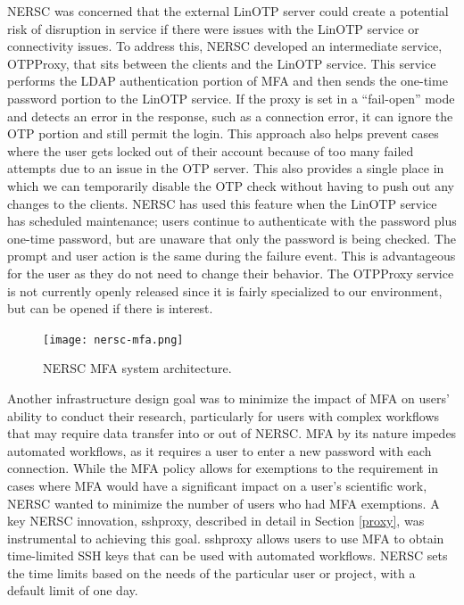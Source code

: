 \documentclass[sigconf,review]{acmart}
\begin{document}
NERSC was concerned that the external LinOTP server could create a potential
risk of disruption in service if there were issues with the LinOTP service or
connectivity issues.  To address this, NERSC developed an intermediate service,
OTPProxy, that sits between the clients and the LinOTP service.  This service
performs the LDAP authentication portion of MFA and then sends the one-time
password portion to the LinOTP service.  If the proxy is set in a ``fail-open''
mode and detects an error in the response, such as a connection error, it can
ignore the OTP portion and still permit the login.  This approach also helps
prevent cases where the user gets locked out of their account because of too
many failed attempts due to an issue in the OTP server.  This also provides a
single place in which we can temporarily disable the OTP check without having to
push out any changes to the clients.  NERSC has used this feature when the
LinOTP service has scheduled maintenance; users continue to authenticate
with the password plus one-time password, but are unaware that only the password
is being checked. The prompt and user action is the same during the failure event.
This is advantageous for the user as they do not need to change their behavior.
The OTPProxy service is not currently openly released since it is fairly specialized
to our environment, but can be opened if there is interest.

\begin{figure}[h!]
  \centering
  \texttt{[image: nersc-mfa.png]}
  \caption{NERSC MFA system architecture.}
  \label{mfa-diagram}
\end{figure}

Another infrastructure design goal was to minimize the impact of MFA on users'
ability to conduct their research, particularly for users with complex workflows
that may require data transfer into or out of NERSC. MFA by its nature impedes
automated workflows, as it requires a user to enter a new password with each
connection. While the MFA policy allows for exemptions to the requirement in
cases where MFA would have a significant impact on a user's scientific work,
NERSC wanted to minimize the number of users who had MFA exemptions. A key NERSC
innovation, sshproxy, described in detail in Section \ref{proxy}, was
instrumental to achieving this goal. sshproxy allows users to use MFA to obtain
time-limited SSH keys that can be used with automated workflows. NERSC sets the
time limits based on the needs of the particular user or project, with a default
limit of one day.
\end{document}
